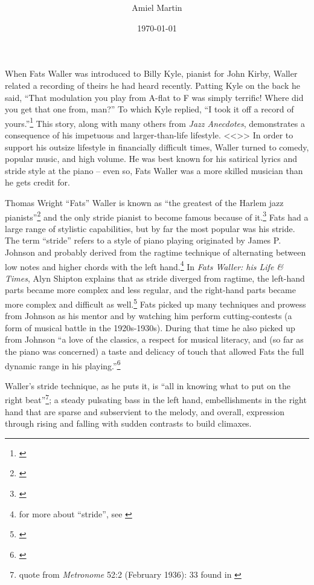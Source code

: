 \documentclass[11pt]{report}
\title{\fattitle \\
	\large \fatslogan}
\author{Amiel Martin}
\date{\today}
\begin{document}
	\maketitle

	\label{sec:introduction}
	When Fats Waller was introduced to Billy Kyle, pianist for John Kirby, Waller related a recording of theirs he had heard recently. Patting Kyle on the back he said, ``That modulation you play from A-flat to F was simply terrific! Where did you get that one from, man?'' To which Kyle replied, ``I took it off a record of yours.''\footnote{\cite[231]{anecdotes}} This story, along with many others from \emph{Jazz Anecdotes}, demonstrates a consequence of his impetuous and larger-than-life lifestyle. <<>> In order to support his outsize lifestyle in financially difficult times, Waller turned to comedy, popular music, and high volume. He was best known for his satirical lyrics and stride style at the piano -- even so, Fats Waller was a more skilled musician than he gets credit for.

	\label{sec:piano_skills}
	Thomas Wright ``Fats'' Waller is known as ``the greatest of the Harlem jazz pianists''\footnote{\cite[2]{life}} and the only stride pianist to become famous because of it.\footnote{\cite[146]{visions}} Fats had a large range of stylistic capabilities, but by far the most popular was his stride. The term ``stride'' refers to a style of piano playing originated by James P. Johnson and probably derived from the ragtime technique of alternating between low notes and higher chords with the left hand.\footnote{for more about ``stride'', see \cite[79]{experience}} In \emph{Fats Waller: his Life \& Times}, Alyn Shipton explains that as stride diverged from ragtime, the left-hand parts became more complex and less regular, and the right-hand parts became more complex and difficult as well.\footnote{\cite[5]{life}} Fats picked up many techniques and prowess from Johnson as his mentor and by watching him perform cutting-contests (a form of musical battle in the 1920s-1930s). During that time he also picked up from Johnson ``a love of the classics, a respect for musical literacy, and (so far as the piano was concerned) a taste and delicacy of touch that allowed Fats the full dynamic range in his playing.''\footnote{\cite[8]{life}}
	
	Waller's stride technique, as he puts it, is ``all in knowing what to put on the right beat''\footnote{quote from \emph{Metronome} 52:2 (February 1936): 33 found in \cite{transcriptions}}; a steady pulsating bass in the left hand, embellishments in the right hand that are sparse and subservient to the melody, and overall, expression through rising and falling with sudden contrasts to build climaxes.
	
\end{document}
